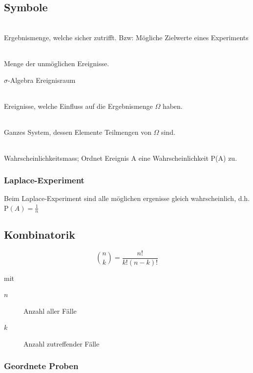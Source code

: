 \subsection{Symbole}

\begin{description}
	\item[$\Omega$] \hfill \\
		Ergebnismenge, welche sicher zutrifft. Bzw: Mögliche Zielwerte eines Experiments
	\item[$\emptyset$] \hfill \\
		Menge der unmöglichen Ereignisse.
	\item{$\sigma$-Algebra}
		Ereignisraum
	\item[Teilmengen] \hfill \\
		Ereignisse, welche Einfluss auf die Ergebnismenge $\Omega$ haben.
	\item[$\mathcal{A}$] \hfill \\
		Ganzes System, dessen Elemente Teilmengen von $\Omega$ sind.
	\item[P] \hfill \\
		Wahrscheinlichkeitsmass; Ordnet Ereignis A eine Wahrscheinlichkeit P(A) zu.
\end{description}

\subsubsection{Laplace-Experiment}

Beim Laplace-Experiment sind alle möglichen ergenisse gleich wahrscheinlich, d.h. $\mathrm{P}(A) = \frac{1}{n}$



\subsection{Kombinatorik}

\[
	\binom{n}{k} = \frac{n!}{k!(n-k)!}
\]

mit
\begin{description}
	\item[$n$] Anzahl aller Fälle
	\item[$k$] Anzahl zutreffender Fälle
\end{description}

\subsubsection{Geordnete Proben}

